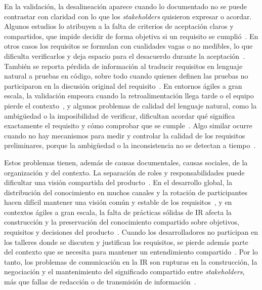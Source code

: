 \documentclass[12pt,letterpaper,oneside]{report}
\begin{document}
En la validación, la desalineación aparece cuando lo documentado no se puede
contrastar con claridad con lo que los \textit{stakeholders} quisieron expresar
o acordar. Algunos estudios lo atribuyen a la falta de criterios de aceptación
claros y compartidos, que impide decidir de forma objetiva si un requisito se
cumplió~\cite{kunz2016}. En otros casos los requisitos se formulan con
cualidades vagas o no medibles, lo que dificulta verificarlos y deja espacio
para el desacuerdo durante la aceptación~\cite{laporte2023}. También se reporta
pérdida de información al traducir requisitos en lenguaje natural a pruebas en
código, sobre todo cuando quienes definen las pruebas no participaron en la
discusión original del requisito~\cite{irshad2021bdd}. En entornos ágiles a
gran escala, la validación empeora cuando la retroalimentación llega tarde o el
equipo pierde el contexto~\cite{kasauli2021}, y algunos problemas de calidad
del lenguaje natural, como la ambigüedad o la imposibilidad de verificar,
dificultan acordar qué significa exactamente el requisito y cómo comprobar que
se cumple~\cite{gentili2025}. Algo similar ocurre cuando no hay mecanismos para
medir y controlar la calidad de los requisitos preliminares, porque la
ambigüedad o la inconsistencia no se detectan a tiempo~\cite{pacheco2022}.

Estos problemas tienen, además de causas documentales, causas sociales, de la
organización y del contexto. La separación de roles y responsabilidades puede dificultar una visión
compartida del producto~\cite{fuller2021blurring}. En el desarrollo global, la
distribución del conocimiento en muchos canales y la rotación de participantes
hacen difícil mantener una visión común y estable de los
requisitos~\cite{xiao2018}, y en contextos ágiles a gran escala, la falta de
prácticas sólidas de IR afecta la construcción y la preservación del
conocimiento compartido sobre objetivos, requisitos y decisiones del
producto~\cite{kasauli2021}. Cuando los desarrolladores no participan en los
talleres donde se discuten y justifican los requisitos, se pierde además parte
del contexto que se necesita para mantener un entendimiento
compartido~\cite{fricker2015}. Por lo tanto, los problemas de comunicación en la IR
son rupturas en la construcción, la negociación y el mantenimiento del
significado compartido entre \textit{stakeholders}, más que fallas de redacción
o de transmisión de información~\cite{fuller2021blurring}.
\end{document}
